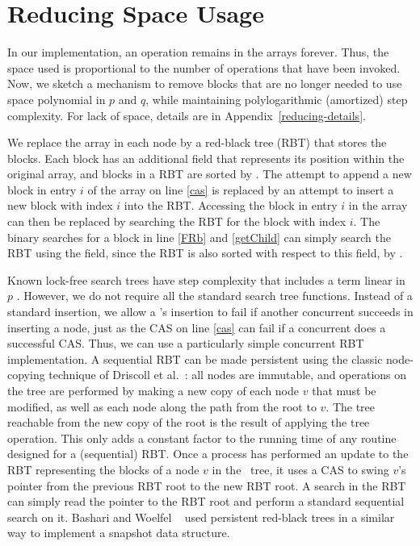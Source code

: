 
\section{Reducing Space Usage}
\label{reducing}

In our implementation, an operation remains in the  arrays forever. 
Thus, the space used is proportional to the number of operations that have been invoked.
Now, we sketch a mechanism to remove blocks that are no longer needed to use space
polynomial in $p$ and $q$, while maintaining polylogarithmic (amortized) step complexity.  For lack of space, details are in Appendix~\ref{reducing-details}.

We replace the  array in each node by a red-black tree (RBT)
that stores the blocks.
Each block has an additional  field
that represents its position within the original  array, and
blocks in a RBT are sorted by .
The attempt to append a new block in entry $i$ of the  array on line \ref{cas}
is replaced by an attempt to insert a new block with index $i$ into the RBT.
Accessing the block in entry $i$ in the  array can then be 
replaced by searching the RBT for the block with index $i$.
The binary searches for a block in line \ref{FRb} and \ref{getChild} can simply search the RBT
using the  field, since the RBT is also sorted with respect to this field, by .
 
Known lock-free search trees have step complexity that includes a term linear in $p$ \cite{EFHR14,Ko20}.  
However, we do not require all the standard search tree functions.
Instead of a standard insertion, we allow a 's insertion to fail if another
concurrent  succeeds in inserting a node, just as the CAS on line \ref{cas}
can fail if a concurrent  does a successful CAS.
Thus, we can use a particularly simple concurrent RBT implementation.
A sequential RBT can be made persistent using the classic node-copying technique of 
Driscoll et al.~\cite{DSST89}:  all nodes are immutable, and operations on the 
tree are performed by making a new copy of each node $v$ that must be modified, as well
as each node along the path from the root to $v$.
The tree reachable from the new copy of the root is the result of applying the tree operation.
This only adds a constant factor to the running time of any routine designed for a (sequential) RBT.
Once a process has performed an update to the RBT representing the blocks of a node 
$v$ in the \ordering\ tree, 
it uses a CAS to swing $v$'s pointer from the previous RBT root to the new RBT root.
A search in the RBT can simply read the pointer to the RBT root and perform a standard
sequential search on it.
Bashari and Woelfel ~\cite{DBLP:conf/podc/BashariW21} used persistent red-black trees in a similar way to implement a snapshot data structure.

